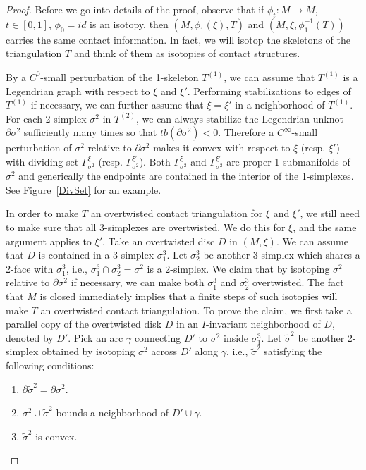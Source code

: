 \documentclass[12pt]{amsart}
\theoremstyle{remark}
\newcommand{\bdry}{\partial}
\newcommand{\be}{\begin{enumerate}}
\newcommand{\ee}{\end{enumerate}}
\begin{document}
\begin{proof}
Before we go into details of the proof, observe that if $\phi_t:M \to M$, $t \in [0,1]$, $\phi_0=id$ is an isotopy, then $(M,\phi_1(\xi),T)$ and $(M,\xi,\phi_1^{-1}(T))$ carries the same contact information. In fact, we will isotop the skeletons of the triangulation $T$ and think of them as isotopies of contact structures.

By a $C^0$-small perturbation of the 1-skeleton $T^{(1)}$, we can assume that $T^{(1)}$ is a Legendrian graph with respect to $\xi$ and $\xi'$. Performing stabilizations to edges of $T^{(1)}$ if necessary, we can further assume that $\xi=\xi'$ in a neighborhood of $T^{(1)}$. For each 2-simplex $\sigma^2$ in $T^{(2)}$, we can always stabilize the Legendrian unknot $\bdry \sigma^2$ sufficiently many times so that $tb(\bdry \sigma^2)<0$. Therefore a $C^\infty$-small perturbation of $\sigma^2$ relative to $\bdry\sigma^2$ makes it convex with respect to $\xi$ (resp. ${\xi'}$) with dividing set $\Gamma_{\sigma^2}^\xi$ (resp. $\Gamma_{\sigma^2}^{\xi'}$). Both $\Gamma_{\sigma^2}^\xi$ and $\Gamma_{\sigma^2}^{\xi'}$ are proper 1-submanifolds of $\sigma^2$ and generically the endpoints are contained in the interior of the 1-simplexes. See Figure~\ref{DivSet} for an example.

In order to make $T$ an overtwisted contact triangulation for $\xi$ and $\xi'$, we still need to make sure that all 3-simplexes are overtwisted. We do this for $\xi$, and the same argument applies to $\xi'$. Take an overtwisted disc $D$ in $(M,\xi)$. We can assume that $D$ is contained in a 3-simplex $\sigma^3_1$. Let $\sigma^3_2$ be another 3-simplex which shares a 2-face with $\sigma^3_1$, i.e., $\sigma^3_1 \cap \sigma^3_2=\sigma^2$ is a 2-simplex. We claim that by isotoping $\sigma^2$ relative to $\bdry \sigma^2$ if necessary, we can make both $\sigma^3_1$ and $\sigma^3_2$ overtwisted. The fact that $M$ is closed immediately implies that a finite steps of such isotopies will make $T$ an overtwisted contact triangulation. To prove the claim, we first take a parallel copy of the overtwisted disk $D$ in an $I$-invariant neighborhood of $D$, denoted by $D'$. Pick an arc $\gamma$ connecting $D'$ to $\sigma^2$ inside $\sigma^3_1$. Let $\tilde\sigma^2$ be another 2-simplex obtained by isotoping $\sigma^2$ across $D'$ along $\gamma$, i.e., $\tilde\sigma^2$ satisfying the following conditions:

\be
\item{$\bdry\tilde\sigma^2=\bdry\sigma^2$.}
\item{$\sigma^2\cup\tilde\sigma^2$ bounds a neighborhood of $D'\cup\gamma$.}
\item{$\tilde\sigma^2$ is convex.}
\ee


\end{proof}
\end{document}
